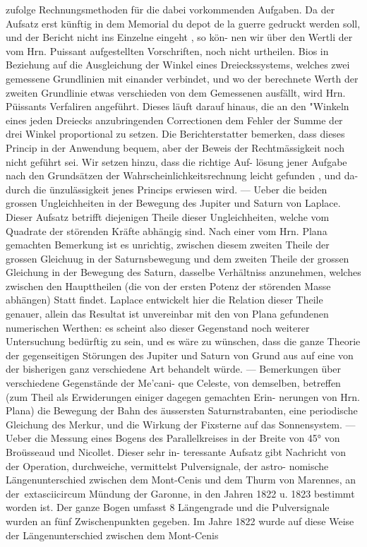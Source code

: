 \documentclass[12pt,a4paper]{article}
\begin{document}
{{{{{{{{zufolge  Rechnungsmethoden  für  die  dabei  vorkommenden  Aufgaben.  Da  der  Aufsatz  erst  künftig  in  dem Memorial  du  depot  de  la  guerre  gedruckt  werden  soll,  und  der  Bericht  nicht  ins  Einzelne  eingeht ,  so  kön- nen wir  über  den  Wertli  der  vom  Hrn.  Puissant  aufgestellten  Vorschriften, noch  nicht  urtheilen.  Bios  in Beziehung  auf  die  Ausgleichung  der  Winkel  eines  Dreieckssystems,  welches  zwei  gemessene  Grundlinien mit  einander  verbindet,  und  wo  der  berechnete  Werth  der  zweiten  Grundlinie  etwas  verschieden  von dem  Gemessenen  ausfällt,  wird  Hrn.  Püissants  Verfaliren  angeführt.  Dieses  läuft  darauf  hinaus,  die  an den  "Winkeln  eines  jeden  Dreiecks  anzubringenden  Correctionen  dem  Fehler  der  Summe  der  drei  Winkel proportional  zu  setzen.  Die  Berichterstatter  bemerken,  dass  dieses  Princip  in  der  Anwendung  bequem, aber  der  Beweis  der  Rechtmässigkeit  noch  nicht  geführt  sei.  Wir  setzen  hinzu,  dass  die  richtige  Auf- lösung jener  Aufgabe  nach  den  Grundsätzen  der  Wahrscheinlichkeitsrechnung  leicht  gefunden ,  und  da- durch die  ünzulässigkeit  jenes  Princips  erwiesen  wird.  ---  Ueber  die  beiden  grossen  Ungleichheiten  in der  Bewegung  des  Jupiter  und  Saturn  von  Laplace.  Dieser  Aufsatz  betrifft  diejenigen  Theile  dieser Ungleichheiten,  welche  vom  Quadrate  der  störenden  Kräfte  abhängig  sind.  Nach  einer  vom  Hrn.  Plana gemachten  Bemerkung  ist  es  unrichtig,  zwischen  diesem  zweiten  Theile  der  grossen  Gleichuug  in  der Saturnsbewegung  und  dem  zweiten  Theile  der  grossen  Gleichung  in  der  Bewegung  des  Saturn,  dasselbe Verhältniss  anzunehmen,  welches  zwischen  den  Haupttheilen  (die  von  der  ersten  Potenz  der  störenden Masse  abhängen)  Statt  findet.  Laplace  entwickelt  hier  die  Relation  dieser  Theile  genauer,  allein  das Resultat  ist  unvereinbar  mit  den  von  Plana  gefundenen  numerischen  Werthen:  es  scheint  also  dieser Gegenstand  noch  weiterer  Untersuchung  bedürftig  zu  sein,  und  es  wäre  zu  wünschen,  dass  die  ganze Theorie  der  gegenseitigen  Störungen  des  Jupiter  und  Saturn  von  Grund  aus  auf  eine  von  der  bisherigen ganz  verschiedene  Art  behandelt  würde.  ---  Bemerkungen  über  verschiedene  Gegenstände  der  Me'cani- que  Celeste,  von  demselben,  betreffen  (zum  Theil  als  Erwiderungen  einiger  dagegen  gemachten  Erin- nerungen von  Hrn.  Plana)  die  Bewegung  der  Bahn  des  äussersten  Saturnstrabanten,  eine  periodische Gleichung  des  Merkur,  und  die  Wirkung  der  Fixsterne  auf  das  Sonnensystem.  ---  Ueber  die  Messung eines  Bogens  des  Parallelkreises  in  der  Breite  von  45°  von  Broüsseaud  und  Nicollet.  Dieser  sehr  in- teressante Aufsatz  gibt  Nachricht  von  der  Operation,  durchweiche,  vermittelst  Pulversignale,  der  astro- nomische Längenunterschied  zwischen  dem  Mont-Cenis  und  dem  Thurm  von  Marennes,  an  der\	extasciicircum{}{ }Mündung der  Garonne,  in  den  Jahren  1822  u.  1823  bestimmt  worden  ist.  Der  ganze  Bogen  umfasst  8  Längengrade und  die  Pulversignale  wurden  an  fünf  Zwischenpunkten  gegeben.  Im  Jahre  1822  wurde  auf  diese  Weise der  Längenunterschied  zwischen  dem  Mont-Cenis  }}}}}}}}
\end{document}
